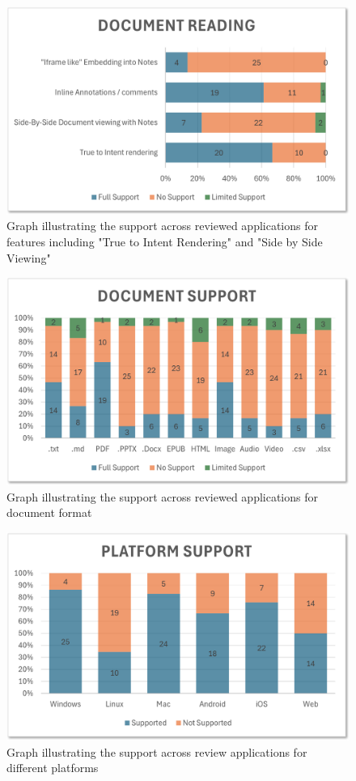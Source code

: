     \begin{figure}
        \centering
        \includegraphics[width=1\linewidth]{Figures/docreading.png}
        \caption{Graph illustrating the support across reviewed applications for features including "True to Intent Rendering" and "Side by Side Viewing"}
        \label{fig:enter-label}
    \end{figure}
    \begin{figure}
        \centering
        \includegraphics[width=1\linewidth]{Figures/docsupp.png}
        \caption{Graph illustrating the support across reviewed applications for document format}
        \label{fig:enter-label}
    \end{figure}
    \begin{figure}
        \centering
        \includegraphics[width=1\linewidth]{Figures/platsupp.png}
        \caption{Graph illustrating the support across review applications for different platforms}
        \label{fig:enter-label}
    \end{figure}
